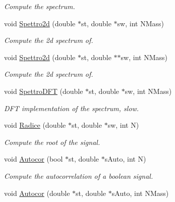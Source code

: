 \begin{DoxyCompactItemize}
\begin{DoxyCompactList}\small\item\em \-Compute the spectrum. \end{DoxyCompactList}\item 
void \hyperlink{classMatematica_a817fad189f184396efc334a2429fdf7a}{\-Spettro2d} (double $\ast$st, double $\ast$sw, int \-N\-Mass)
\begin{DoxyCompactList}\small\item\em \-Compute the 2d spectrum of. \end{DoxyCompactList}\item 
void \hyperlink{classMatematica_a4529a3aade5c9592905c7febebac662a}{\-Spettro2d} (double $\ast$st, double $\ast$$\ast$sw, int \-N\-Mass)
\begin{DoxyCompactList}\small\item\em \-Compute the 2d spectrum of. \end{DoxyCompactList}\item 
\hypertarget{classMatematica_a8244ce9b83c8b38d0004086377ec137c}{void \hyperlink{classMatematica_a8244ce9b83c8b38d0004086377ec137c}{\-Spettro\-D\-F\-T} (double $\ast$st, double $\ast$sw, int \-N\-Mass)}\label{classMatematica_a8244ce9b83c8b38d0004086377ec137c}

\begin{DoxyCompactList}\small\item\em \-D\-F\-T implementation of the spectrum, slow. \end{DoxyCompactList}\item 
\hypertarget{classMatematica_aeac3632a9ced53cee7f0bda92208dd07}{void \hyperlink{classMatematica_aeac3632a9ced53cee7f0bda92208dd07}{\-Radice} (double $\ast$st, double $\ast$sw, int \-N)}\label{classMatematica_aeac3632a9ced53cee7f0bda92208dd07}

\begin{DoxyCompactList}\small\item\em \-Compute the root of the signal. \end{DoxyCompactList}\item 
\hypertarget{classMatematica_a6410e1f3b747f1e313e9d3bcffe004ce}{void \hyperlink{classMatematica_a6410e1f3b747f1e313e9d3bcffe004ce}{\-Autocor} (bool $\ast$st, double $\ast$s\-Auto, int \-N)}\label{classMatematica_a6410e1f3b747f1e313e9d3bcffe004ce}

\begin{DoxyCompactList}\small\item\em \-Compute the autocorrelation of a boolean signal. \end{DoxyCompactList}\item 
\hypertarget{classMatematica_af0661121d63e1dddda156d2e46b4c39d}{void \hyperlink{classMatematica_af0661121d63e1dddda156d2e46b4c39d}{\-Autocor} (double $\ast$st, double $\ast$s\-Auto, int \-N\-Mass)}\label{classMatematica_af0661121d63e1dddda156d2e46b4c39d}


\end{DoxyCompactItemize}
